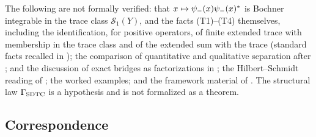 The following are not formally verified: that \(x\mapsto\psi_{-}(x)\psi_{-}(x)^*\)
is Bochner integrable in the trace class \(\mathcal S_1(Y)\), and the
facts (T1)--(T4) themselves, including the identification, for positive
operators, of finite extended trace with membership in the trace class
and of the extended sum with the trace (standard facts recalled in
); the comparison of quantitative and
qualitative separation after
;
 and the discussion of
exact bridges as factorizations in ; the
Hilbert--Schmidt reading of
; the worked
examples; and the framework material of .  The
structural law \(\Gamma_{\mathrm{SDTC}}\) is a hypothesis and is not formalized as a
theorem.

\subsection*{Correspondence}

